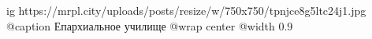  
 
 
 
 

\ifcmt
  ig https://mrpl.city/uploads/posts/resize/w/750x750/tpnjce8g5ltc24j1.jpg
	@caption Епархиальное училище
  @wrap center
  @width 0.9
\fi
